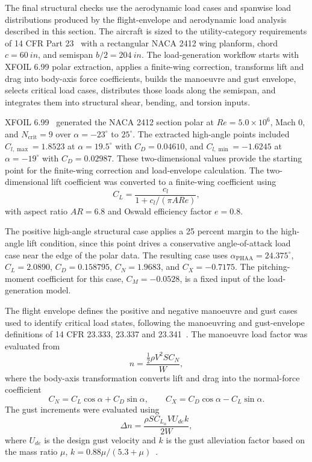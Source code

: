 \documentclass[11pt]{article}
\begin{document}
The final structural checks use the aerodynamic load cases and spanwise load distributions produced by the flight-envelope and aerodynamic load analysis described in this section. The aircraft is sized to the utility-category requirements of 14 CFR Part 23~\cite{far23} with a rectangular NACA 2412 wing planform, chord $c=\SI{60}{in}$, and semispan $b/2=\SI{204}{in}$. The load-generation workflow starts with XFOIL 6.99 polar extraction, applies a finite-wing correction, transforms lift and drag into body-axis force coefficients, builds the manoeuvre and gust envelope, selects critical load cases, distributes those loads along the semispan, and integrates them into structural shear, bending, and torsion inputs.

XFOIL 6.99~\cite{xfoil} generated the NACA 2412 section polar at $Re=5.0\times10^6$, Mach 0, and $N_{\mathrm{crit}}=9$ over $\alpha=-23^\circ$ to $25^\circ$. The extracted high-angle points included $C_{l,\max}=1.8523$ at $\alpha=19.5^\circ$ with $C_D=0.04610$, and $C_{l,\min}=-1.6245$ at $\alpha=-19^\circ$ with $C_D=0.02987$. These two-dimensional values provide the starting point for the finite-wing correction and load-envelope calculation. The two-dimensional lift coefficient was converted to a finite-wing coefficient using
\begin{equation}
  C_L = \frac{c_l}{1 + c_l/(\pi ARe)},
\end{equation}
with aspect ratio $AR=6.8$ and Oswald efficiency factor $e=0.8$.

The positive high-angle structural case applies a 25 percent margin to the high-angle lift condition, since this point drives a conservative angle-of-attack load case near the edge of the polar data. The resulting case uses $\alpha_{\mathrm{PHAA}}=24.375^\circ$, $C_L=2.0890$, $C_D=0.158795$, $C_N=1.9683$, and $C_X=-0.7175$. The pitching-moment coefficient for this case, $C_M=-0.0528$, is a fixed input of the load-generation model.

The flight envelope defines the positive and negative manoeuvre and gust cases used to identify critical load states, following the manoeuvring and gust-envelope definitions of 14 CFR 23.333, 23.337 and 23.341~\cite{far23}. The manoeuvre load factor was evaluated from
\begin{equation}
  n = \frac{\frac{1}{2}\rho V^2 S C_N}{W},
\end{equation}
where the body-axis transformation converts lift and drag into the normal-force coefficient
\begin{equation}
  C_N = C_L \cos\alpha + C_D \sin\alpha,
  \qquad
  C_X = C_D \cos\alpha - C_L \sin\alpha .
\end{equation}
The gust increments were evaluated using
\begin{equation}
  \Delta n =
  \frac{\rho S C_{L_\alpha} V U_{de} k}{2W},
\end{equation}
where $U_{de}$ is the design gust velocity and $k$ is the gust alleviation factor based on the mass ratio $\mu$, $k = 0.88\mu/(5.3+\mu)$~\cite{far23}.
\end{document}
